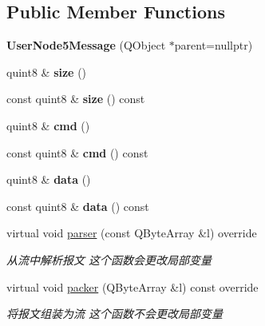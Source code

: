 \subsection*{Public Member Functions}
\begin{DoxyCompactItemize}
\item 
\mbox{\label{class_user_node5_message_a98fa4a0696e81930ce158e825c770c85}} 
{\bfseries User\+Node5\+Message} (Q\+Object $\ast$parent=nullptr)
\item 
\mbox{\label{class_user_node5_message_ac314154c9f459cdbf915bbefa9162ca7}} 
quint8 \& {\bfseries size} ()
\item 
\mbox{\label{class_user_node5_message_a7d9ad3d71430795e3e46752e58af1807}} 
const quint8 \& {\bfseries size} () const
\item 
\mbox{\label{class_user_node5_message_a22ff329306fcf18203112c7ea2757a15}} 
quint8 \& {\bfseries cmd} ()
\item 
\mbox{\label{class_user_node5_message_a3f92efce47dce120bd4abf4ef1f21b8d}} 
const quint8 \& {\bfseries cmd} () const
\item 
\mbox{\label{class_user_node5_message_ae5424339ca98c8691247191840ef9aa3}} 
quint8 \& {\bfseries data} ()
\item 
\mbox{\label{class_user_node5_message_a11efc3f25e66d97c0138ede939991c01}} 
const quint8 \& {\bfseries data} () const
\item 
virtual void \mbox{\hyperlink{class_user_node5_message_a76fbe29793cfd72a8ad9eb7dfee40dca}{parser}} (const Q\+Byte\+Array \&l) override
\begin{DoxyCompactList}\small\item\em 从流中解析报文 这个函数会更改局部变量 \end{DoxyCompactList}\item 
virtual void \mbox{\hyperlink{class_user_node5_message_a156632abacd2c3d4a4b7782d6f5d54d5}{packer}} (Q\+Byte\+Array \&l) const override
\begin{DoxyCompactList}\small\item\em 将报文组装为流 这个函数不会更改局部变量 \end{DoxyCompactList}\end{DoxyCompactItemize}


